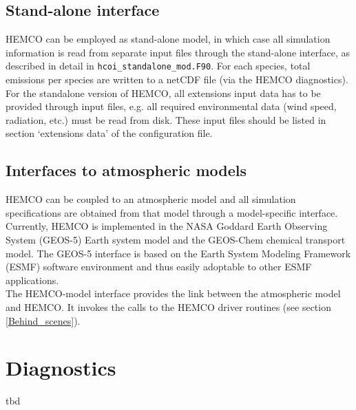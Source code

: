 \documentclass[12pt,a4paper]{article} %
\begin{document}
\subsection{Stand-alone interface}
HEMCO can be employed as stand-alone model, in which case all simulation information is read from separate input files through the stand-alone interface, as described in detail in \texttt{hcoi\_standalone\_mod.F90}. For each species, total emissions per species are written to a netCDF file (via the HEMCO diagnostics).\\
For the standalone version of HEMCO, all extensions input data has to be provided through input files, e.g. all required environmental data (wind speed, radiation, etc.) must be read from disk. These input files should be listed in section ‘extensions data’ of the configuration file.

\subsection{Interfaces to atmospheric models}
HEMCO can be coupled to an atmospheric model and all simulation specifications are obtained from that model through a model-specific interface. Currently, HEMCO is implemented in the NASA Goddard Earth Observing System (GEOS-5) Earth system model and the GEOS-Chem chemical transport model. The GEOS-5 interface is based on the Earth System Modeling Framework (ESMF) software environment and thus easily adoptable to other ESMF applications.\\
The HEMCO-model interface provides the link between the atmospheric model and HEMCO. It invokes the calls to the HEMCO driver routines (see section \ref{Behind_scenes}).

\section{Diagnostics} \label{Diagnostics}
tbd
\end{document}
